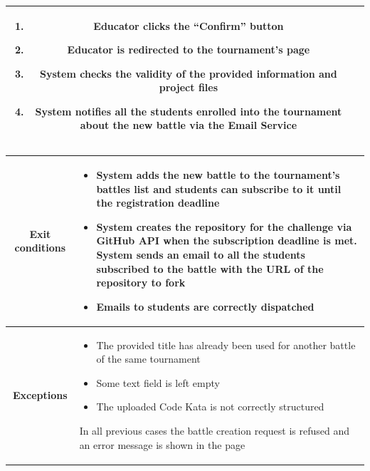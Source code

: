 \begin{center}
\begin{tabular}{ |c|m{10cm}| }
\begin{enumerate}
            \item Educator clicks the “Confirm” button
            \item Educator is redirected to the tournament’s page
            \item System checks the validity of the provided information and project files
            \item System notifies all the students enrolled into the tournament about the new battle via the Email Service
        \end{enumerate} \\
        \hline
    \end{tabular}
    \newpage
    \begin{tabular}{ |c|m{10cm}| }
        \hline
        \textbf{Exit conditions} &
        \begin{itemize}
            \item System adds the new battle to the tournament’s battles list and students can subscribe to it until the registration deadline
            \item System creates the repository for the challenge via GitHub API when the subscription deadline is met. System sends an email to all the students subscribed to the battle with the URL of the repository to fork
            \item Emails to students are correctly dispatched
        \end{itemize} \\
        \hline
        \textbf{Exceptions} & 
        \begin{itemize}
            \item The provided title has already been used for another battle of the same tournament 
            \item Some text field is left empty
            \item The uploaded Code Kata is not correctly structured
        \end{itemize} 
        In all previous cases the battle creation request is refused and an error message is shown in the page \\
        \hline
    \end{tabular}
    \begin{figure}[H]
        \hspace{7px}

\end{figure}
\end{center}
